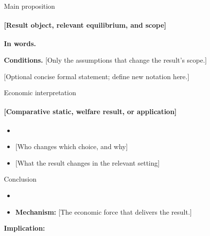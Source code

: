\documentclass[11pt, aspectratio=169]{beamer}
\begin{document}
\begin{frame}{Main proposition}
  \framesubtitle{[Result object, relevant equilibrium, and scope]}
  \begin{ResultBox}
    \textbf{In words.} \ResultHeadlineSlide

    \smallskip
    \textbf{Conditions.} [Only the assumptions that change the result's scope.]

    \smallskip
    {\small [Optional concise formal statement; define new notation here.]}
  \end{ResultBox}
  \hypertarget{main:proof}{}%
\end{frame}

\begin{frame}{Economic interpretation}
  \framesubtitle{[Comparative static, welfare result, or application]}
  \medskip
  \begin{itemize}\setlength{\itemsep}{0.75em}
    \item {} \ResultSupportSlide
    \item {} [Who changes which choice, and why]
    \item {} [What the result changes in the relevant setting]
  \end{itemize}

  \hypertarget{main:extension}{}%
\end{frame}

\begin{frame}{Conclusion}
  \medskip
  \begin{itemize}\setlength{\itemsep}{0.95em}
    \item {}
    \item \textbf{Mechanism:} [The economic force that delivers the result.]
  \end{itemize}

  \bigskip
  \textbf{Implication:} \ResultImplicationSlide
\end{frame}
\end{document}

